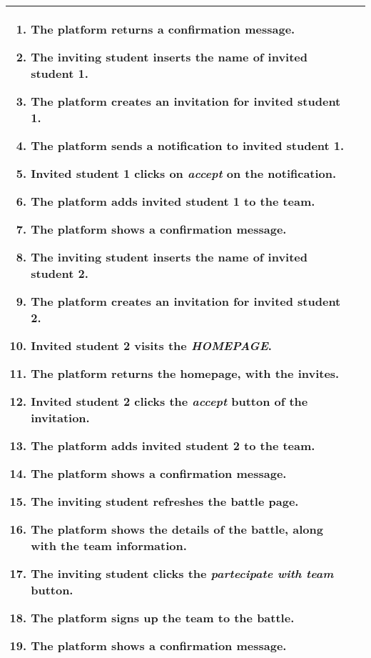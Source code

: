 \begin{enumerate}[label=\textbf{UC\arabic*}:,leftmargin=1.3cm]
\begin{table}[H]
\begin{tabular}{|l|p{11.9cm}|}
\begin{enumerate}[label=\arabic*.]
                              \item The platform returns a confirmation message.
                              \item The inviting student inserts the name of invited student 1.
                              \item The platform creates an invitation for invited student 1.
                              \item The platform sends a notification to invited student 1.
                              \item Invited student 1 clicks on \emph{accept} on the notification.
                              \item The platform adds invited student 1 to the team.
                              \item The platform shows a confirmation message.
                              \item The inviting student inserts the name of invited student 2.
                              \item The platform creates an invitation for invited student 2.
                              \item Invited student 2 visits the \emph{HOMEPAGE}.
                              \item The platform returns the homepage, with the invites.
                              \item Invited student 2 clicks the \emph{accept} button of the invitation.
                              \item The platform adds invited student 2 to the team.
                              \item The platform shows a confirmation message.
                              \item The inviting student refreshes the battle page.
                              \item The platform shows the details of the battle, along with the team information.
                              \item The inviting student clicks the \emph{partecipate with team} button.
                              \item The platform signs up the team to the battle.
                              \item The platform shows a confirmation message.
                        \end{enumerate}                    \\\hline

\end{tabular}
\end{table}
\end{enumerate}
